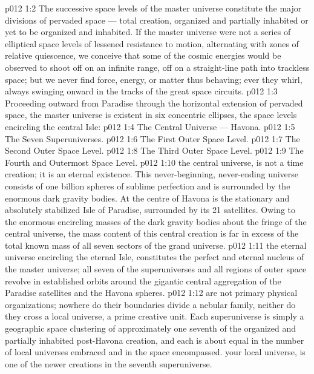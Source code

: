 \vs p012 1:2 The successive space levels of the master universe constitute the major divisions of pervaded space --- total creation, organized and partially inhabited or yet to be organized and inhabited. If the master universe were not a series of elliptical space levels of lessened resistance to motion, alternating with zones of relative quiescence, we conceive that some of the cosmic energies would be observed to shoot off on an infinite range, off on a straight\hyp{}line path into trackless space; but we never find force, energy, or matter thus behaving; ever they whirl, always swinging onward in the tracks of the great space circuits.
\vs p012 1:3 \pc Proceeding outward from Paradise through the horizontal extension of pervaded space, the master universe is existent in six concentric ellipses, the space levels encircling the central Isle:
\vs p012 1:4 \bibnobreakspace The Central Universe --- Havona.
\vs p012 1:5 \bibnobreakspace The Seven Superuniverses.
\vs p012 1:6 \bibnobreakspace The First Outer Space Level.
\vs p012 1:7 \bibnobreakspace The Second Outer Space Level.
\vs p012 1:8 \bibnobreakspace The Third Outer Space Level.
\vs p012 1:9 \bibnobreakspace The Fourth and Outermost Space Level.
\vs p012 1:10 \pc {} the central universe, is not a time creation; it is an eternal existence. This never\hyp{}beginning, never\hyp{}ending universe consists of one billion spheres of sublime perfection and is surrounded by the enormous dark gravity bodies. At the centre of Havona is the stationary and absolutely stabilized Isle of Paradise, surrounded by its 21 satellites. Owing to the enormous encircling masses of the dark gravity bodies about the fringe of the central universe, the mass content of this central creation is far in excess of the total known mass of all seven sectors of the grand universe.
\vs p012 1:11 \pc {} the eternal universe encircling the eternal Isle, constitutes the perfect and eternal nucleus of the master universe; all seven of the superuniverses and all regions of outer space revolve in established orbits around the gigantic central aggregation of the Paradise satellites and the Havona spheres.
\vs p012 1:12  are not primary physical organizations; nowhere do their boundaries divide a nebular family, neither do they cross a local universe, a prime creative unit. Each superuniverse is simply a geographic space clustering of approximately one seventh of the organized and partially inhabited post\hyp{}Havona creation, and each is about equal in the number of local universes embraced and in the space encompassed.  your local universe, is one of the newer creations in  the seventh superuniverse.
